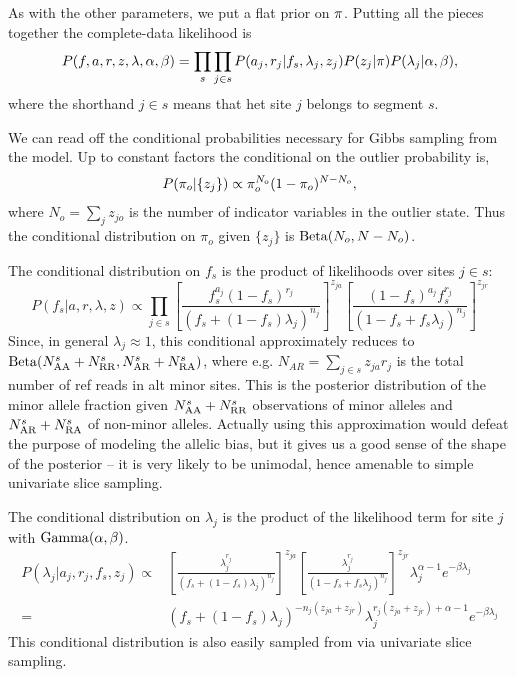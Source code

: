 \documentclass[nofootinbib,amssymb,amsmath]{revtex4}
\begin{document}
As with the other parameters, we put a flat prior on ${\rm \pi}$.  Putting all the pieces together the complete-data likelihood is
\begin{equation}
P(f, a, r, z, \lambda, \alpha, \beta) = \prod_s \prod_{j \in s} P(a_j, r_j | f_s, \lambda_j, z_j) P(z_j | {\rm \pi}) P(\lambda_j | \alpha, \beta),
\end{equation}
%
where the shorthand $j \in s$ means that het site $j$ belongs to segment $s$.

We can read off the conditional probabilities necessary for Gibbs sampling from the model.  Up to constant factors the conditional on the outlier probability is,
%
\begin{align}
P(\pi_o | \{ z_j \}) \propto \pi_o^{N_{\rm o}} (1 - \pi_o)^{N - N_o},
\label{conditional_on_pi}
\end{align}
%
where $N_o = \sum_j z_{jo}$ is the number of indicator variables in the outlier state.  Thus the conditional distribution on $\pi_o$ given $\{ z_j \}$ is ${\rm Beta}(N_o, N - N_o)$.

The conditional distribution on $f_s$ is the product of likelihoods over sites $j \in s$:
%
\begin{equation}
P(f_s | a, r, \lambda, z) \propto \prod_{j \in s}
\left[ \frac{f_s^{a_j} (1 - f_s)^{r_j}}{ \left( f_s + (1-f_s) \lambda_j\right)^{n_j}} \right]^{z_{ja}}   
\left[ \frac{(1-f_s)^{a_j} f_s^{r_j} }{ \left( 1 - f_s + f_s \lambda_j\right)^{n_j}} \right]^{z_{jr}}   
\label{conditional_on_f}
\end{equation}
%
Since, in general $\lambda_j \approx 1$, this conditional approximately reduces to ${\rm Beta}(N^s_{\rm AA} + N^s_{\rm RR}, N^s_{\rm AR} + N^s_{\rm RA})$, where e.g. $N_{AR} = \sum_{j \in s} z_{ja} r_j$ is the total number of ref reads in alt minor sites.   This is the posterior distribution of the minor allele fraction given $N^s_{\rm AA} + N^s_{\rm RR}$ observations of minor alleles and $N^s_{\rm AR} + N^s_{\rm RA}$ of non-minor alleles.  Actually using this approximation would defeat the purpose of modeling the allelic bias, but it gives us a good sense of the shape of the posterior -- it is very likely to be unimodal, hence amenable to simple univariate slice sampling.

The conditional distribution on $\lambda_j$ is the product of the likelihood term for site $j$ with ${\rm Gamma}(\alpha, \beta)$.  
%
\begin{align}
P(\lambda_j | a_j, r_j, f_s, z_j) \propto & \left[  \frac{\lambda_j^{r_j}}{ \left( f_s + (1-f_s) \lambda_j \right)^{n_j}} \right]^{z_{ja}}   
\left[  \frac{\lambda_j^{r_j}}{ \left( 1 - f_s + f_s \lambda_j \right)^{n_j}} \right]^{z_{jr}}   
\lambda_j^{\alpha-1} e^{- \beta \lambda_j} \\
= &
\left( f_s + (1-f_s) \lambda_j \right)^{-n_j  (z_{ja} + z_{jr})} \lambda_j^{r_j (z_{ja} + z_{jr}) + \alpha-1} e^{- \beta \lambda_j} 
\label{conditional_on_lambda}
\end{align}
%
This conditional distribution is also easily sampled from via univariate slice sampling.
\end{document}
